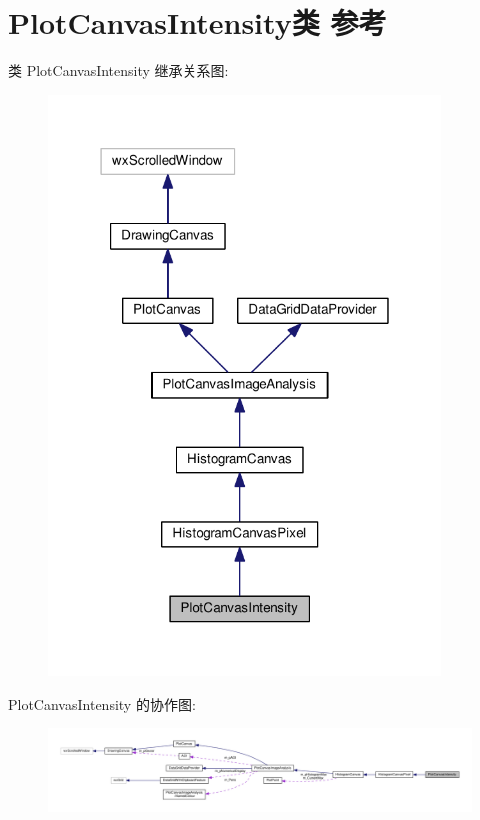 \hypertarget{class_plot_canvas_intensity}{\section{Plot\+Canvas\+Intensity类 参考}
\label{class_plot_canvas_intensity}
}


类 Plot\+Canvas\+Intensity 继承关系图\+:
\nopagebreak
\begin{figure}[H]
\begin{center}
\leavevmode
\includegraphics[width=295pt]{class_plot_canvas_intensity__inherit__graph}
\end{center}
\end{figure}


Plot\+Canvas\+Intensity 的协作图\+:
\nopagebreak
\begin{figure}[H]
\begin{center}
\leavevmode
\includegraphics[width=350pt]{class_plot_canvas_intensity__coll__graph}
\end{center}
\end{figure}
